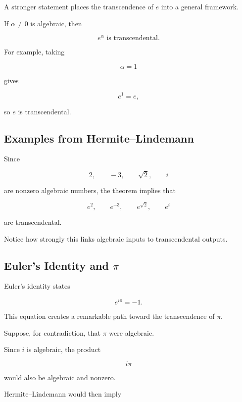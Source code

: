 A stronger statement places the transcendence of \(e\) into a general
framework.

\begin{theorem}
If \(\alpha\neq0\) is algebraic, then

\[ \boxed{e^\alpha\text{ is transcendental}.} \]
\end{theorem}

For example, taking

\[ \alpha=1 \]

gives

\[ e^1=e, \]

so \(e\) is transcendental.

\subsection{Examples from Hermite--Lindemann}
\label{subsec:hermite-lindemann-examples}

Since

\[ 2,\qquad -3,\qquad\sqrt2,\qquad i \]

are nonzero algebraic numbers, the theorem implies that

\[
e^2,\qquad
e^{-3},\qquad
e^{\sqrt2},\qquad
e^i
\]

are transcendental.

Notice how strongly this links algebraic inputs to transcendental outputs.

\subsection{Euler's Identity and \(\pi\)}
\label{subsec:euler-identity-pi}

Euler's identity states

\[ \boxed{e^{i\pi}=-1.} \]

This equation creates a remarkable path toward the transcendence of \(\pi\).

Suppose, for contradiction, that \(\pi\) were algebraic.

Since \(i\) is algebraic, the product

\[ i\pi \]

would also be algebraic and nonzero.

Hermite--Lindemann would then imply

